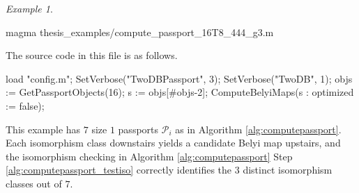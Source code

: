 \documentclass{dcthesis}
\newcommand{\mm}[1]{{\color{blue} \sf MM: [#1]}}
\numberwithin{equation}{section}
\theoremstyle{definition}
\theoremstyle{remark}
\newtheorem{example}[equation]{Example}
\begin{document}
{{{\begin{example}
      \begin{code}
magma thesis_examples/compute_passport_16T8_444_g3.m
      \end{code}
      The source code in this file is
      as follows.
      \begin{magma}
load "config.m";
SetVerbose("TwoDBPassport", 3);
SetVerbose("TwoDB", 1);
objs := GetPassportObjects(16);
s := objs[#objs-2];
ComputeBelyiMaps(s : optimized := false);
      \end{magma}
      This example has $7$ size $1$ passports
      $\mathcal{P}_i$ as in
      Algorithm \ref{alg:computepassport}.
      Each isomorphism class downstairs
      yields a candidate Belyi map upstairs,
      and the isomorphism
      checking in
      Algorithm
      \ref{alg:computepassport}
      Step
      \ref{alg:computepassport_testiso}
      correctly identifies the
      $3$ distinct isomorphism classes
      out of $7$.
    \end{example}
  }
}}
\end{document}
